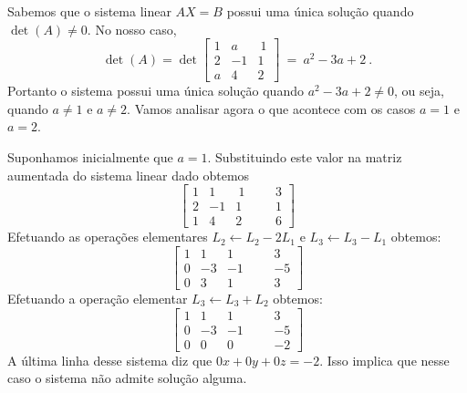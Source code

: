 \begin{solution}  Sabemos que o sistema linear $AX=B$ possui uma única solução quando $\det(A) \neq 0$. No nosso caso,
$$ \det(A) = \det\left[\begin{array}{rrr}
  1 &  a &  \ 1  \\
  2 & -1 &    1  \\ 
  a &  4 &    2  \end{array}\right]\ =\ a^2-3a+2\ . $$
Portanto o sistema possui uma única solução quando $a^2-3a+2 \neq 0$, ou seja, quando $a\neq 1$ e $a\neq 2$.
Vamos analisar agora o que acontece com os casos $a=1$ e $a=2$.

\medskip
Suponhamos inicialmente que $a=1$. Substituindo este valor na matriz aumentada do sistema linear dado obtemos
$$ \left[\begin{array}{rrrr|rr}
  1 &  1 &  \ 1 & & &   3  \\
  2 & -1 &    1 & & &   1  \\ 
  1 &  4 &    2 & & &   6  \end{array}\right] $$
Efetuando as operações elementares $L_2 \leftarrow L_2 - 2L_1$ e $L_3 \leftarrow L_3 - L_1$ obtemos:
$$ \left[\begin{array}{rrrr|rr}
  1 &  1 &  1 & & &   3  \\
  0 & -3 & -1 & & &  -5  \\ 
  0 &  3 &  1 & & &   3 \end{array}\right] $$
Efetuando a operação elementar $L_3 \leftarrow L_3 + L_2$ obtemos:
$$ \left[\begin{array}{rrrr|rr}
  1 &  1 &  1 & & &   3  \\
  0 & -3 & -1 & & &  -5  \\ 
  0 &  0 &  0 & & &  -2 \end{array}\right] $$
A última linha desse sistema diz que $0x+0y+0z=-2$. Isso implica que nesse caso o sistema não admite solução alguma.


\end{solution}
